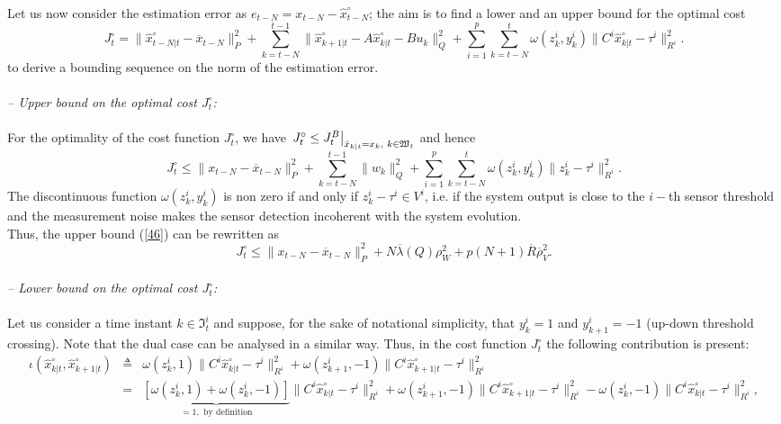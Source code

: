 \documentclass[11pt,journal,onecolumn]{IEEEtran}
\begin{document}
Let us now consider the estimation error as $e_{t-N}= x_{t-N}-\hat{x}_{t-N}^{\circ}$; the aim is to find a lower and an upper bound for the optimal cost
\begin{equation}\label{45c}
J_{t}^{\circ}
=\|\hat{x}_{t-N|t}^{\circ}-\overline{x}_{t-N}\|^{2}_{P}+\sum_{k=t-N}^{t-1}\|\hat{x}_{k+1|t}^{\circ}-A\hat{x}_{k|t}^{\circ}-Bu_{k}\|^{2}_{Q}
+\sum_{i=1}^{p}\sum_{k=t-N}^{t}\omega(z_{k}^{i},y_{k}^{i})\|C^{i}\hat{x}_{k|t}^{\circ}-\tau^{i}\|^{2}_{R^{i}}.
\end{equation}
to derive a bounding sequence on the norm of the estimation error. \\ \\
\textit{-- Upper bound on the optimal cost $J_{t}^{\circ}$:} \\ \\
For the optimality of the cost function $J^{\circ}_{t}$, we have $\left.J^{\circ}_{t}\leq J_{t}^{B}\right|_{\hat{x}_{k|t}=x_{k},\hspace{1mm}k\in\mathfrak W_{t}}$ and hence
\begin{equation}\label{46}
J_{t}^{\circ} \leqslant \|x_{t-N}-\overline{x}_{t-N}\|^{2}_{P}
+\sum_{k=t-N}^{t-1}\|w_{k}\|^{2}_{Q}+\sum_{i=1}^{p}\sum_{k=t-N}^{t}\omega(z_{k}^{i},y_{k}^{i})\|z_{k}^{i}-\tau^{i}\|^{2}_{R^{i}}.
\end{equation}
The discontinuous function $\omega(z_{k}^{i},y_{k}^{i})$ is non zero if and only if $z_{k}^{i}-\tau^{i} \in V^{i}$, i.e. if the system output is close to the $i-$th sensor threshold and the measurement noise makes the sensor detection incoherent with the system evolution. \\
Thus, the upper bound (\ref{46}) can be rewritten as
\begin{equation}\label{47}
J_{t}^{\circ}\leq\|x_{t-N}-\overline{x}_{t-N}\|^{2}_{P}+N\overline{\lambda}(Q)\rho^{2}_{W}+p(N+1)\overline{R}\overline{\rho}^{2}_{V}.
\end{equation}\\
\textit{-- Lower bound on the optimal cost $J_{t}^{\circ}$:} \\ \\
Let us consider a time instant $k\in\mathfrak{I}_{t}^{i}$ and suppose, for the sake of notational simplicity, that $y^{i}_{k}=1$ and $y^{i}_{k+1}=-1$
(up-down threshold crossing). Note that the dual case can be analysed in a similar way.
Thus, in the cost function $J_{t}^{\circ}$ the following contribution is present:
\begin{eqnarray*}\label{50}
\iota(\hat{x}_{k|t}^{\circ},\hat{x}_{k+1|t}^{\circ})&\triangleq&\omega(z_{k}^{i},1)\|C^{i}\hat{x}_{k|t}^{\circ}-\tau^{i}\|^{2}_{R^{i}} +\omega(z_{k+1}^{i},-1)\|C^{i}\hat{x}_{k+1|t}^{\circ}-\tau^{i}\|^{2}_{R^{i}}\nonumber \\
&=&\underbrace{\left[\omega(z_{k}^{i},1)+\omega(z_{k}^{i},-1)\right]}_{=1,\text{ by definition}}\|C^{i}\hat{x}_{k|t}^{\circ}-\tau^{i}\|^{2}_{R^{i}}
+\omega(z_{k+1}^{i},-1)\|C^{i}\hat{x}_{k+1|t}^{\circ}-\tau^{i}\|^{2}_{R^{i}} - \omega(z_{k}^{i},-1)\|C^{i}\hat{x}_{k|t}^{\circ}-\tau^{i}\|^{2}_{R^{i}},
\end{eqnarray*}
\end{document}
